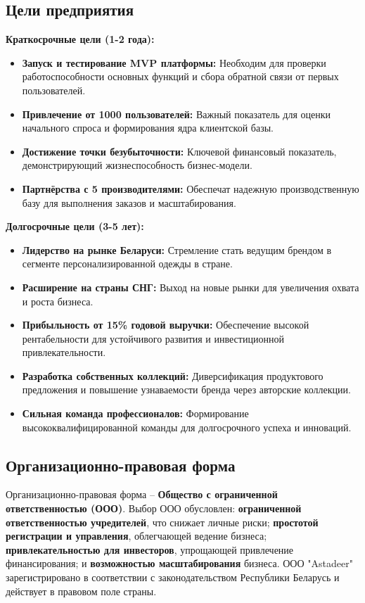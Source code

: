\subsection{Цели предприятия}

\textbf{Краткосрочные цели (1-2 года):}
\begin{itemize}
    \item \textbf{Запуск и тестирование MVP платформы:}  Необходим для проверки работоспособности основных функций и сбора обратной связи от первых пользователей.
    \item \textbf{Привлечение от 1000 пользователей:}  Важный показатель для оценки начального спроса и формирования ядра клиентской базы.
    \item \textbf{Достижение точки безубыточности:}  Ключевой финансовый показатель, демонстрирующий жизнеспособность бизнес-модели.
    \item \textbf{Партнёрства с 5 производителями:}  Обеспечат надежную производственную базу для выполнения заказов и масштабирования.
\end{itemize}

\textbf{Долгосрочные цели (3-5 лет):}
\begin{itemize}
    \item \textbf{Лидерство на рынке Беларуси:}  Стремление стать ведущим брендом в сегменте персонализированной одежды в стране.
    \item \textbf{Расширение на страны СНГ:}  Выход на новые рынки для увеличения охвата и роста бизнеса.
    \item \textbf{Прибыльность от 15\% годовой выручки:}  Обеспечение высокой рентабельности для устойчивого развития и инвестиционной привлекательности.
    \item \textbf{Разработка собственных коллекций:}  Диверсификация продуктового предложения и повышение узнаваемости бренда через авторские коллекции.
    \item \textbf{Сильная команда профессионалов:}  Формирование высококвалифицированной команды для долгосрочного успеха и инноваций.
\end{itemize}

\subsection{Организационно-правовая форма}

Организационно-правовая форма – \textbf{Общество с ограниченной ответственностью (ООО)}.  Выбор ООО обусловлен: \textbf{ограниченной ответственностью учредителей}, что снижает личные риски; \textbf{простотой регистрации и управления}, облегчающей ведение бизнеса; \textbf{привлекательностью для инвесторов}, упрощающей привлечение финансирования; и \textbf{возможностью масштабирования} бизнеса. ООО "Astadeer" зарегистрировано в соответствии с законодательством Республики Беларусь и действует в правовом поле страны.

